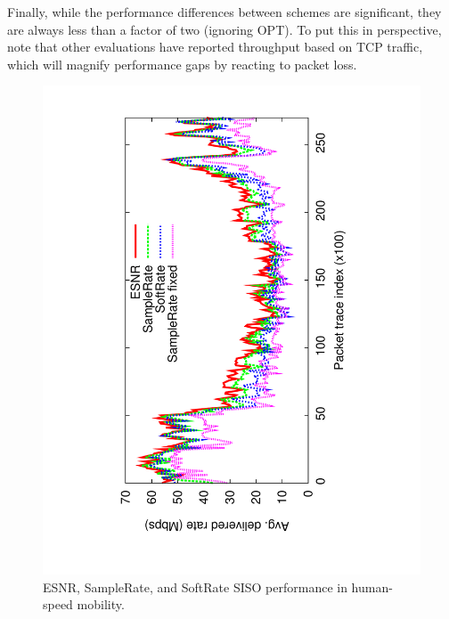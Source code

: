 Finally, while the performance differences between schemes are significant, they are always less than a factor of two (ignoring OPT). To put this in perspective, note that other evaluations have reported throughput based on TCP traffic, which will magnify performance gaps by reacting to packet loss.


\begin{figure}[t]
      \centering
      \includegraphics[angle=-90,viewport=120 68 491 760,clip,width=0.95\columnwidth]{figures/esnr/siso_rate_time_opt_eff_sr_so.pdf}
      \vspace{-2pt}
      \caption{\label{fig:siso_rate_time_opt_eff_sr_so} ESNR, SampleRate, and SoftRate SISO performance in human-speed mobility.}
      \vspace{-2pt}
\end{figure}

